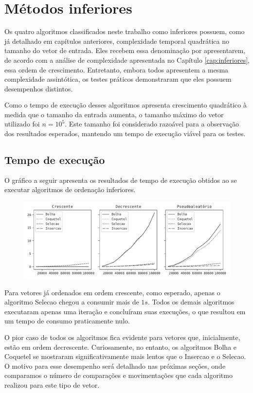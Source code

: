 \section{Métodos inferiores}
Os quatro algoritmos classificados neste trabalho como inferiores possuem, como já detalhado em capítulos anteriores, complexidade temporal quadrática no tamanho do vetor de entrada. Eles recebem essa denominação por apresentarem, de acordo com a análise de complexidade apresentada no Capítulo \ref{cap:inferiores}, essa ordem de crescimento. Entretanto, embora todos apresentem a mesma complexidade assintótica, os testes práticos demonstraram que eles possuem desempenhos distintos.

Como o tempo de execução desses algoritmos apresenta crescimento quadrático à medida que o tamanho da entrada aumenta, o tamanho máximo do vetor utilizado foi $n=10^5$. Este tamanho foi considerado razoável para a observação dos resultados esperados, mantendo um tempo de execução viável para os testes.

\subsection{Tempo de execução}
O gráfico a seguir apresenta os resultados de tempo de execução obtidos ao se executar algoritmos de ordenação inferiores.

\begin{figure}[H]
\centering
\includegraphics[scale=0.787]{figuras/pdf/inferiores.tempo.pdf}
\end{figure}

Para vetores já ordenados em ordem crescente, como esperado, apenas o algoritmo Selecao chegou a consumir mais de $1s$. Todos os demais algoritmos executaram apenas uma iteração e concluíram suas execuções, o que resultou em um tempo de consumo praticamente nulo.

O pior caso de todos os algoritmos fica evidente para vetores que, inicialmente, estão em ordem decrescente. Curiosamente, no entanto, os algoritmos Bolha e Coquetel se mostraram significativamente mais lentos que o Insercao e o Selecao. O motivo para esse desempenho será detalhado nas próximas seções, onde comparamos o número de comparações e movimentações que cada algoritmo realizou para este tipo de vetor.

